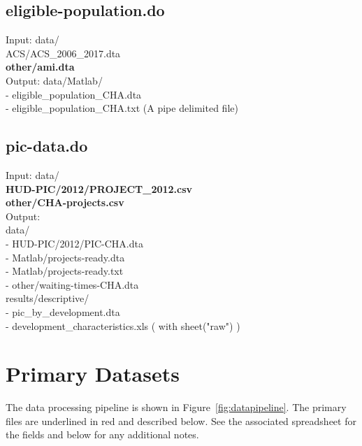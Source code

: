 \documentclass[11pt]{article}
\begin{document}
\subsection{eligible-population.do}
Input: data/\\
ACS/ACS\_2006\_2017.dta\\
\textbf{other/ami.dta}\\
Output: data/Matlab/ \\
- eligible\_population\_CHA.dta\\
- eligible\_population\_CHA.txt (A pipe delimited file)

\subsection{pic-data.do}
Input: data/ \\
\textbf{HUD-PIC/2012/PROJECT\_2012.csv} \\
\textbf{other/CHA-projects.csv} \\
Output: \\
data/ \\
- HUD-PIC/2012/PIC-CHA.dta \\
- Matlab/projects-ready.dta \\
- Matlab/projects-ready.txt \\
- other/waiting-times-CHA.dta\\
results/descriptive/ \\
-   pic\_by\_development.dta \\
- development\_characteristics.xls ( with sheet("raw") ) \\

\section{Primary Datasets}
The data processing pipeline is shown in Figure~\ref{fig:datapipeline}. The primary files are underlined in red  and described below. See the associated  spreadsheet for the fields and below for any additional notes.
\end{document}
